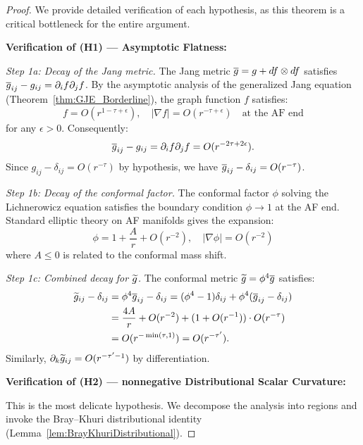 \begin{proof}
We provide detailed verification of each hypothesis, as this theorem is a critical bottleneck for the entire argument.

\textbf{Verification of (H1) --- Asymptotic Flatness:}

\textit{Step 1a: Decay of the Jang metric.}
The Jang metric $\overline{g} = g + df \otimes df$ satisfies $\overline{g}_{ij} - g_{ij} = \partial_i f \partial_j f$. By the asymptotic analysis of the generalized Jang equation (Theorem~\ref{thm:GJE_Borderline}), the graph function $f$ satisfies:
\begin{equation}
    f = O(r^{1-\tau+\epsilon}), \quad |\nabla f| = O(r^{-\tau+\epsilon}) \quad \text{at the AF end}
\end{equation}
for any $\epsilon > 0$. Consequently:
\begin{equation}
    \overline{g}_{ij} - g_{ij} = \partial_i f \partial_j f = O(r^{-2\tau+2\epsilon}).
\end{equation}
Since $g_{ij} - \delta_{ij} = O(r^{-\tau})$ by hypothesis, we have $\overline{g}_{ij} - \delta_{ij} = O(r^{-\tau})$.

\textit{Step 1b: Decay of the conformal factor.}
The conformal factor $\phi$ solving the Lichnerowicz equation satisfies the boundary condition $\phi \to 1$ at the AF end. Standard elliptic theory on AF manifolds gives the expansion:
\begin{equation}
    \phi = 1 + \frac{A}{r} + O(r^{-2}), \quad |\nabla \phi| = O(r^{-2})
\end{equation}
where $A \le 0$ is related to the conformal mass shift.

\textit{Step 1c: Combined decay for $\widetilde{g}$.}
The conformal metric $\widetilde{g} = \phi^4 \overline{g}$ satisfies:
\begin{equation*} \begin{aligned} \widetilde{g}_{ij} - \delta_{ij} &= \phi^4 \overline{g}_{ij} - \delta_{ij} = (\phi^4 - 1)\delta_{ij} + \phi^4(\overline{g}_{ij} - \delta_{ij}) \\
& = \frac{4A}{r} + O(r^{-2}) + (1 + O(r^{-1})) \cdot O(r^{-\tau}) \\
& = O(r^{-\min(\tau,1)}) = O(r^{-\tau'}).
\end{aligned} \end{equation*}
Similarly, $\partial_k \widetilde{g}_{ij} = O(r^{-\tau'-1})$ by differentiation.

\textbf{Verification of (H2) --- nonnegative Distributional Scalar Curvature:}

This is the most delicate hypothesis. We decompose the analysis into regions and invoke the Bray--Khuri distributional identity (Lemma~\ref{lem:BrayKhuriDistributional}).


\end{proof}
